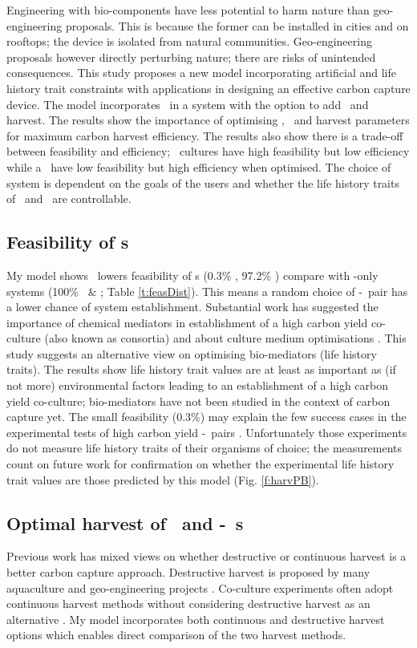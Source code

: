 \documentclass[env.tex]{subfiles}
\begin{document}
Engineering with bio-components have less potential to harm nature than geo-engineering proposals.  This is because the former can be installed in cities and on rooftops; the device is isolated from natural communities.  Geo-engineering proposals however directly perturbing nature; there are risks of unintended consequences.  This study proposes a new model incorporating artificial and life history trait constraints with applications in designing an effective carbon capture device.  The model incorporates \phy\ in a system with the option to add \bac\ and harvest.  The results show the importance of optimising \phy, \bac\ and harvest parameters for maximum carbon harvest efficiency.  The results also show there is a trade-off between feasibility and efficiency; \phy\ cultures have high feasibility but low efficiency while a \pbs\ have low feasibility but high efficiency when optimised.  The choice of system is dependent on the goals of the users and whether the life history traits of \phy\ and \bac\ are controllable.

\subsection{Feasibility of \pbs s}
My model shows \bac\ lowers feasibility of \pbs s (0.3\% \PBH, 97.2\% \PBN) compare with \phy-only systems (100\% \PoH\ \& \PoN; Table \ref{t:feasDist}).  This means a random choice of \phy-\bac\ pair has a lower chance of system establishment.  Substantial work has suggested the importance of chemical mediators in establishment of a high carbon yield co-culture (also known as consortia) and about culture medium optimisations \autocite{rivas2010interactions,amin2009photolysis,fuentes2016impact}.  This study suggests an alternative view on optimising bio-mediators (life history traits).  The results show life history trait values are at least as important as (if not more) environmental factors leading to an establishment of a high carbon yield co-culture; bio-mediators have not been studied in the context of carbon capture yet.  The small feasibility (0.3\%) may explain the few success cases in the experimental tests of high carbon yield \phy-\bac\ pairs \autocite{fuentes2016impact}.  Unfortunately those experiments do not measure life history traits of their organisms of choice; the measurements count on future work for confirmation on whether the experimental life history trait values are those predicted by this model (Fig. \ref{f:harvPB}).

\subsection{Optimal harvest of \phy\ and \phy-\bac\ \pbs s}
Previous work has mixed views on whether destructive or continuous harvest is a better carbon capture approach.  Destructive harvest is proposed by many aquaculture and geo-engineering projects \autocite{lawrence2014efficiency,krause2016substantial}.  Co-culture experiments often adopt continuous harvest methods without considering destructive harvest as an alternative \autocite{kim2008anaerobic,kazamia2012mutualistic}.  My model incorporates both continuous and destructive harvest options which enables direct comparison of the two harvest methods.
\end{document}
